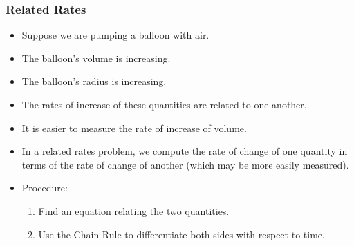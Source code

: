 \begin{frame}
\frametitle{Related Rates}
\begin{itemize}
\item  Suppose we are pumping a balloon with air.
\item  The balloon's volume is increasing.
\item  The balloon's radius is increasing.
\item  The rates of increase of these quantities are related to one another.
\item<2->  It is easier to measure the rate of increase of volume.
\item<3->  In a related rates problem, we compute the rate of change of one quantity in terms of the rate of change of another (which may be more easily measured).
\item<4->  Procedure:
\begin{enumerate}
\item<4->  Find an equation relating the two quantities.
\item<4->  Use the Chain Rule to differentiate both sides with respect to time.
\end{enumerate}
\end{itemize}
\end{frame}
